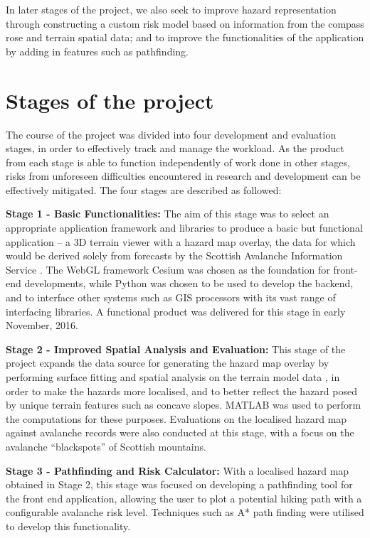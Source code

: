 \documentclass[openany]{UoYCSproject}
\begin{document}
In later stages of the project, we also seek to improve hazard representation through constructing a custom risk model based on information from the compass rose and terrain spatial data; and to improve the functionalities of the application by adding in features such as pathfinding.

\section{Stages of the project}

The course of the project was divided into four development and evaluation stages, in order to effectively track and manage the workload. As the product from each stage is able to function independently of work done in other stages, risks from unforeseen difficulties encountered in research and development can be effectively mitigated. The four stages are described as followed:

\textbf{Stage 1 - Basic Functionalities:} The aim of this stage was to select an appropriate application framework and libraries to produce a basic but functional application -- a 3D terrain viewer with a hazard map overlay, the data for which would be derived solely from forecasts by the Scottish Avalanche Information Service \cite{sais}. The WebGL framework Cesium \cite{cesium} was chosen as the foundation for front-end developments, while Python was chosen to be used to develop the backend, and to interface other systems such as GIS processors with its vast range of interfacing libraries. A functional product was delivered for this stage in early November, 2016.

\textbf{Stage 2 - Improved Spatial Analysis and Evaluation:} This stage of the project expands the data source for generating the hazard map overlay by performing surface fitting and spatial analysis on the terrain model data \cite{os-5}, in order to make the hazards more localised, and to better reflect the hazard posed by unique terrain features such as concave slopes. MATLAB \cite{matlab-primer} was used to perform the computations for these purposes. Evaluations on the localised hazard map against avalanche records were also conducted at this stage, with a focus on the avalanche ``blackspots'' of Scottish mountains.

\textbf{Stage 3 - Pathfinding and Risk Calculator:} With a localised hazard map obtained in Stage 2, this stage was focused on developing a pathfinding tool for the front end application, allowing the user to plot a potential hiking path with a configurable avalanche risk level. Techniques such as A* path finding \cite{cui2011based} were utilised to develop this functionality. 
\end{document}
